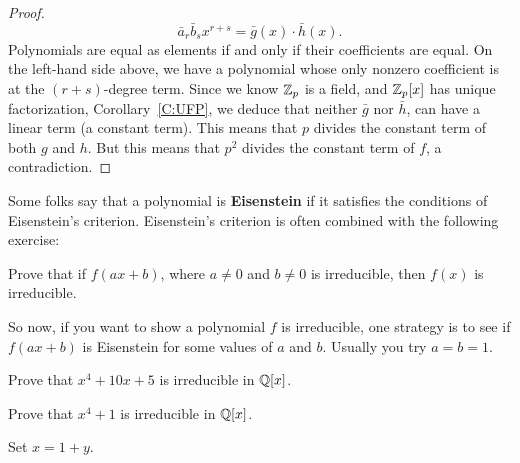 \documentclass{ximera}
\begin{document}
\begin{theorem}
\begin{proof}
    \[
    \bar{a}_r\bar{b}_sx^{r+s}=  \bar{g}(x)\cdot \bar{h}(x).
    \]
    Polynomials are equal as elements if and only if their
    coefficients are equal. On the left-hand side above, we have a
    polynomial whose only nonzero coefficient is at the $(r+s)$-degree
    term. Since we know $\mathbb Z_p$ is a field, and $\mathbb Z_p[x]$ has unique
    factorization, Corollary~\ref{C:UFP}, we deduce that neither
    $\bar{g}$ nor $\bar{h}$, can have a linear term (a constant
    term). This means that $p$ divides the constant term of both $g$
    and $h$. But this means that $p^2$ divides the constant term of
    $f$, a contradiction.
  \end{proof}
\end{theorem}

Some folks say that a polynomial is \textbf{Eisenstein} if it
satisfies the conditions of Eisenstein's criterion. Eisenstein's
criterion is often combined with the following exercise:
\begin{exercise}\label{E:et}
  Prove that if $f(ax+b)$, where $a\ne 0$ and $b\ne 0$ is irreducible,
  then $f(x)$ is irreducible.
\end{exercise}
So now, if you want to show a polynomial $f$ is irreducible, one
strategy is to see if $f(ax+b)$ is Eisenstein for some values of $a$
and $b$. Usually you try $a=b=1$.


\begin{exercise}
  Prove that $x^4 + 10x + 5$ is irreducible in $\mathbb Q[x]$.
\end{exercise}



\begin{exercise}
  Prove that $x^4 + 1$ is irreducible in $\mathbb Q[x]$.
  \begin{hint}
    Set $x = 1+y$.
  \end{hint}
\end{exercise}
\end{document}
